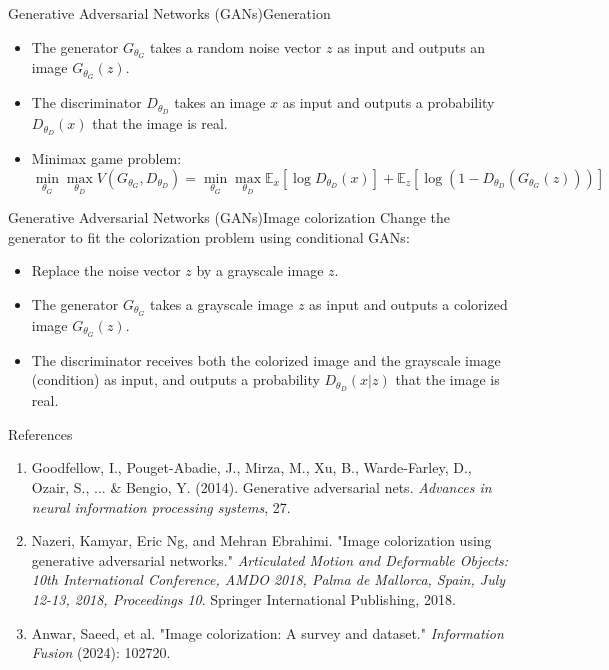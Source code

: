 \documentclass[aspectratio=169]{beamer}
\theoremstyle{definition}
\begin{document}
\begin{frame}{Generative Adversarial Networks (GANs)}{Generation}
    \begin{itemize}
        \item The generator $G_{\theta_G}$ takes a random noise vector $z$ as input and outputs an image $G_{\theta_G}(z)$.
        \item The discriminator $D_{\theta_D}$ takes an image $x$ as input and outputs a probability $D_{\theta_D}(x)$ that the image is real.
        \item Minimax game problem:
        \begin{equation}
            \min_{\theta_G}\max_{\theta_D} V(G_{\theta_G}, D_{\theta_D}) = \min_{\theta_G}\max_{\theta_D}\mathbb{E}_x[\log D_{\theta_D}(x)] + \mathbb{E}_z[\log(1 - D_{\theta_D}(G_{\theta_G}(z)))]
        \end{equation}
    \end{itemize}
\end{frame}

\begin{frame}{Generative Adversarial Networks (GANs)}{Image colorization}
    Change the generator to fit the colorization problem using conditional GANs:
    \begin{itemize}
        \item Replace the noise vector $z$ by a grayscale image $z$.
        \item The generator $G_{\theta_G}$ takes a grayscale image $z$ as input and outputs a colorized image $G_{\theta_G}(z)$.
        \item The discriminator receives both the colorized image and the grayscale image (condition) as input, and outputs a probability $D_{\theta_D}(x|z)$ that the image is real.
    \end{itemize}
\end{frame}

\begin{frame}{References}
    \begin{enumerate}
        \item Goodfellow, I., Pouget-Abadie, J., Mirza, M., Xu, B., Warde-Farley, D., Ozair, S., ... \& Bengio, Y. (2014). Generative adversarial nets. \emph{Advances in neural information processing systems}, 27.
        \item Nazeri, Kamyar, Eric Ng, and Mehran Ebrahimi. "Image colorization using generative adversarial networks." \emph{Articulated Motion and Deformable Objects: 10th International Conference, AMDO 2018, Palma de Mallorca, Spain, July 12-13, 2018, Proceedings 10}. Springer International Publishing, 2018.
        \item Anwar, Saeed, et al. "Image colorization: A survey and dataset." \emph{Information Fusion} (2024): 102720.
    \end{enumerate}
\end{frame}
\end{document}
